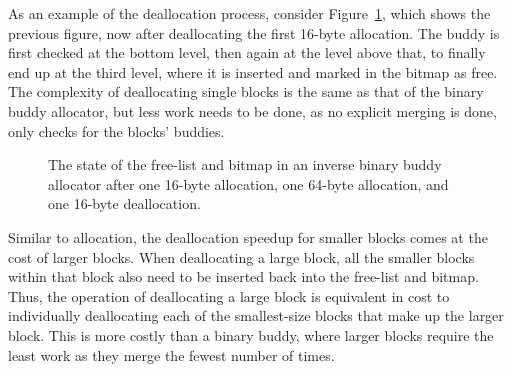 As an example of the deallocation process, consider Figure~\ref{fig:ibuddydeallocated}, which shows the previous figure, now after deallocating the first 16-byte allocation. The buddy is first checked at the bottom level, then again at the level above that, to finally end up at the third level, where it is inserted and marked in the bitmap as free. The complexity of deallocating single blocks is the same as that of the binary buddy allocator, but less work needs to be done, as no explicit merging is done, only checks for the blocks' buddies.

\begin{figure}[h]
  \centering
  
  \caption{The state of the free-list and bitmap in an inverse binary buddy allocator after one
    16-byte allocation, one 64-byte allocation, and one 16-byte deallocation.}
  \label{fig:ibuddydeallocated}
\end{figure}

Similar to allocation, the deallocation speedup for smaller blocks comes at the cost of larger blocks. When deallocating a large block, all the smaller blocks within that block also need to be inserted back into the free-list and bitmap. Thus, the operation of deallocating a large block is equivalent in cost to individually deallocating each of the smallest-size blocks that make up the larger block. This is more costly than a binary buddy, where larger blocks require the least work as they merge the fewest number of times.

